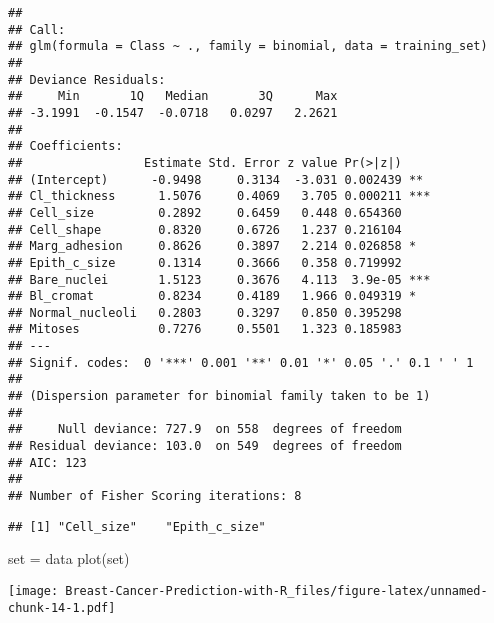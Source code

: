 \documentclass[
]{article}
\newenvironment{Shaded}{\begin{snugshade}}{\end{snugshade}}
\newcommand{\DecValTok}[1]{\textcolor[rgb]{0.00,0.00,0.81}{#1}}
\newcommand{\FloatTok}[1]{\textcolor[rgb]{0.00,0.00,0.81}{#1}}
\newcommand{\FunctionTok}[1]{\textcolor[rgb]{0.00,0.00,0.00}{#1}}
\newcommand{\NormalTok}[1]{#1}
\newcommand{\OtherTok}[1]{\textcolor[rgb]{0.56,0.35,0.01}{#1}}
\newcommand{\SpecialCharTok}[1]{\textcolor[rgb]{0.00,0.00,0.00}{#1}}
\begin{document}
\begin{verbatim}
## 
## Call:
## glm(formula = Class ~ ., family = binomial, data = training_set)
## 
## Deviance Residuals: 
##     Min       1Q   Median       3Q      Max  
## -3.1991  -0.1547  -0.0718   0.0297   2.2621  
## 
## Coefficients:
##                 Estimate Std. Error z value Pr(>|z|)    
## (Intercept)      -0.9498     0.3134  -3.031 0.002439 ** 
## Cl_thickness      1.5076     0.4069   3.705 0.000211 ***
## Cell_size         0.2892     0.6459   0.448 0.654360    
## Cell_shape        0.8320     0.6726   1.237 0.216104    
## Marg_adhesion     0.8626     0.3897   2.214 0.026858 *  
## Epith_c_size      0.1314     0.3666   0.358 0.719992    
## Bare_nuclei       1.5123     0.3676   4.113  3.9e-05 ***
## Bl_cromat         0.8234     0.4189   1.966 0.049319 *  
## Normal_nucleoli   0.2803     0.3297   0.850 0.395298    
## Mitoses           0.7276     0.5501   1.323 0.185983    
## ---
## Signif. codes:  0 '***' 0.001 '**' 0.01 '*' 0.05 '.' 0.1 ' ' 1
## 
## (Dispersion parameter for binomial family taken to be 1)
## 
##     Null deviance: 727.9  on 558  degrees of freedom
## Residual deviance: 103.0  on 549  degrees of freedom
## AIC: 123
## 
## Number of Fisher Scoring iterations: 8
\end{verbatim}

\begin{Shaded}
\end{Shaded}

\begin{verbatim}
## [1] "Cell_size"    "Epith_c_size"
\end{verbatim}

\begin{Shaded}
\begin{Highlighting}[]
\NormalTok{set }\OtherTok{=}\NormalTok{ data}
\FunctionTok{plot}\NormalTok{(set)}
\end{Highlighting}
\end{Shaded}

\texttt{[image: Breast-Cancer-Prediction-with-R\_files/figure-latex/unnamed-chunk-14-1.pdf]}
\end{document}
